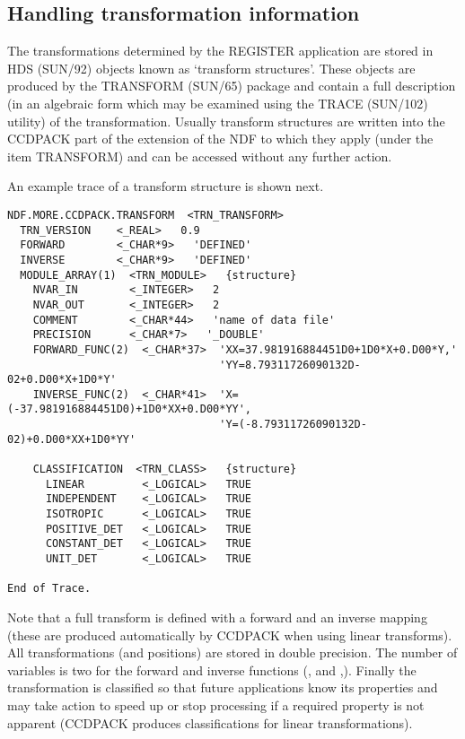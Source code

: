 \subsection{Handling transformation information}
\label{handling_transforms}
The transformations determined by the REGISTER application are stored in
HDS (SUN/92) objects known as `transform structures'. These objects are
produced by the TRANSFORM (SUN/65) package and contain a full
description (in an algebraic form which may be examined using the TRACE
(SUN/102) utility) of the transformation. Usually transform structures
are written into the CCDPACK part of the extension of the NDF to which
they apply (under the item TRANSFORM) and can be accessed without any
further action.

An example trace of a transform structure is shown next.

\begin{myquote}
\begin{verbatim}
NDF.MORE.CCDPACK.TRANSFORM  <TRN_TRANSFORM>
  TRN_VERSION    <_REAL>   0.9
  FORWARD        <_CHAR*9>   'DEFINED'
  INVERSE        <_CHAR*9>   'DEFINED'
  MODULE_ARRAY(1)  <TRN_MODULE>   {structure}
    NVAR_IN        <_INTEGER>   2
    NVAR_OUT       <_INTEGER>   2
    COMMENT        <_CHAR*44>   'name of data file'
    PRECISION      <_CHAR*7>   '_DOUBLE'
    FORWARD_FUNC(2)  <_CHAR*37>  'XX=37.981916884451D0+1D0*X+0.D00*Y,'
                                 'YY=8.79311726090132D-02+0.D00*X+1D0*Y'
    INVERSE_FUNC(2)  <_CHAR*41>  'X=(-37.981916884451D0)+1D0*XX+0.D00*YY',
                                 'Y=(-8.79311726090132D-02)+0.D00*XX+1D0*YY'
    
    CLASSIFICATION  <TRN_CLASS>   {structure}
      LINEAR         <_LOGICAL>   TRUE
      INDEPENDENT    <_LOGICAL>   TRUE
      ISOTROPIC      <_LOGICAL>   TRUE
      POSITIVE_DET   <_LOGICAL>   TRUE
      CONSTANT_DET   <_LOGICAL>   TRUE
      UNIT_DET       <_LOGICAL>   TRUE

End of Trace.
\end{verbatim}
\end{myquote}

Note that a full transform is defined with a forward and an inverse
mapping (these are produced automatically by CCDPACK when using linear
transforms). All transformations (and positions) are stored in double
precision. The number of variables is two for the forward and inverse
functions (, and ,). Finally
the transformation is classified so that future applications know its
properties and may take action to speed up or stop processing if a
required property is not apparent (CCDPACK produces classifications for
linear transformations).

